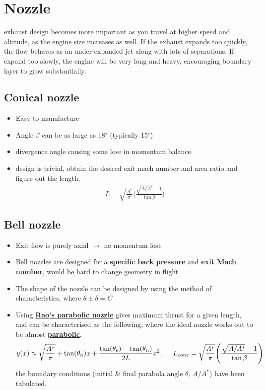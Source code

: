 \documentclass[a4paper,10pt]{article}
\begin{document}
\newpage
\section{Nozzle}
exhaust design becomes more important as you travel at higher speed and altitude, as the engine size increases as well. If the exhaust expands too quickly, the flow behaves as an under-expanded jet along with lots of separations. If expand too slowly, the engine will be very long and heavy, encouraging boundary layer to grow substantially. 

\subsection{Conical nozzle}
\begin{itemize}
    \item Easy to manufacture
    \item Angle $\beta$ can be as large as 18$^{\circ}$ (typically 15$^{\circ}$)
    \item divergence angle causing some lose in momentum balance. 
    \item design is trivial, obtain the desired exit mach number and area ratio and figure out the length. 
        \begin{gather*}
            L = \sqrt{\frac{A^*}{\pi}}\Bigg(\frac{\sqrt{A/A^*}-1}{\tan\beta}\Bigg)
        \end{gather*}
\end{itemize}

\vspace*{-0.4cm}
\subsection{Bell nozzle}
\begin{itemize}
    \item Exit flow is purely axial $\rightarrow$ no momentum lost 
    \item Bell nozzles are designed for a \textbf{specific back pressure} and \textbf{exit Mach number}, would be hard to change geometry in flight
    \item The shape of the nozzle can be designed by using the method of characteristics, where $\theta\pm\delta=C$
    \item Using \underline{\textbf{Rao's parabolic nozzle}} gives maximum thrust for a given length, and can be characterised as the following, where the ideal nozzle works out to be almost \underline{\textbf{parabolic}}. 
        \begin{gather*}
            y(x)\approx\sqrt{\frac{A^*}{\pi}}+\tan(\theta_n)x+\frac{\tan(\theta_e)-\tan(\theta_n)}{2L}x^2,\hspace*{0.5cm}L_{cone} = \sqrt{\frac{A^*}{\pi}}\Bigg(\frac{\sqrt{A/A^*}-1}{\tan\beta}\Bigg)
        \end{gather*}
    the boundary conditions (initial \& final parabola angle $\theta$, $A/A^*$) have been tabulated. 
\end{itemize}
\end{document}
